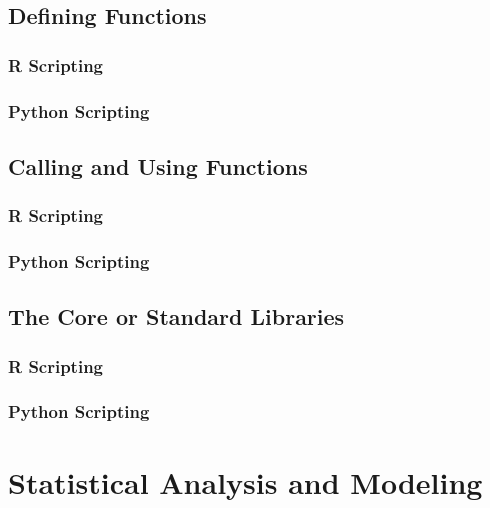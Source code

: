 \documentclass[]{book}
\theoremstyle{definition}
\theoremstyle{definition}
\theoremstyle{definition}
\theoremstyle{remark}
\begin{document}
\section{Defining Functions}\label{defining-functions-1}

\subsection{R Scripting}\label{r-scripting-8}

\subsection{Python Scripting}\label{python-scripting-8}

\section{Calling and Using
Functions}\label{calling-and-using-functions-1}

\subsection{R Scripting}\label{r-scripting-9}

\subsection{Python Scripting}\label{python-scripting-9}

\section{The Core or Standard
Libraries}\label{the-core-or-standard-libraries}

\subsection{R Scripting}\label{r-scripting-10}

\subsection{Python Scripting}\label{python-scripting-10}

\chapter{Statistical Analysis and
Modeling}\label{statistical-analysis-and-modeling}
\end{document}
